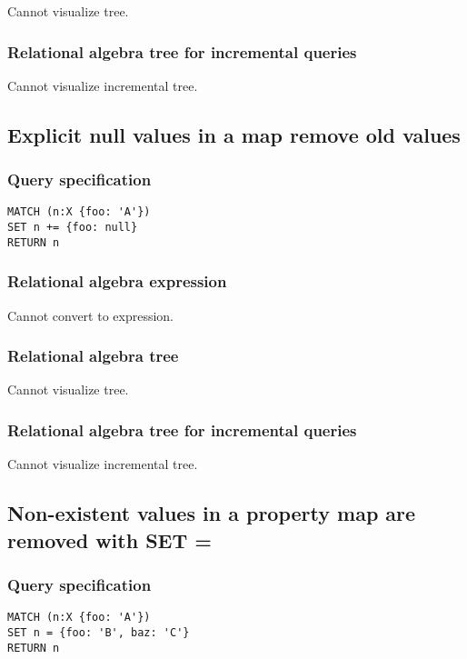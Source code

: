 Cannot visualize tree.

\subsubsection*{Relational algebra tree for incremental queries}

Cannot visualize incremental tree.

\subsection{Explicit null values in a map remove old values}

\subsubsection*{Query specification}

\begin{lstlisting}
MATCH (n:X {foo: 'A'})
SET n += {foo: null}
RETURN n
\end{lstlisting}

\subsubsection*{Relational algebra expression}

Cannot convert to expression.

\subsubsection*{Relational algebra tree}

Cannot visualize tree.

\subsubsection*{Relational algebra tree for incremental queries}

Cannot visualize incremental tree.

\subsection{Non-existent values in a property map are removed with SET =}

\subsubsection*{Query specification}

\begin{lstlisting}
MATCH (n:X {foo: 'A'})
SET n = {foo: 'B', baz: 'C'}
RETURN n
\end{lstlisting}

